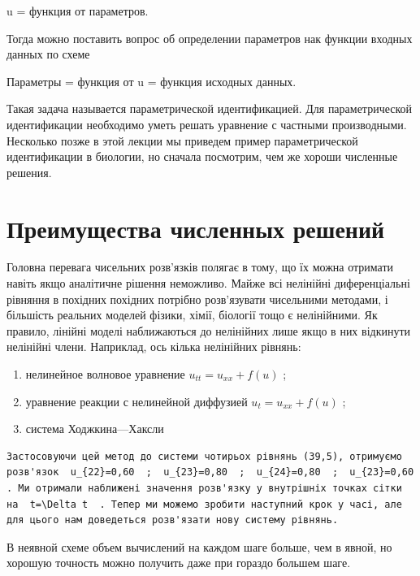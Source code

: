 \documentclass[
  ukrainian,
]{article}
\begin{document}
u = функция от параметров.

Тогда можно поставить вопрос об определении параметров нак функции
входных данных по схеме

Параметры = функция от u = функция исходных данных.

Такая задача называется параметрической идентификацией. Для
параметрической идентификации необходимо уметь решать уравнение с
частными производными. Несколько позже в этой лекции мы приведем пример
параметрической идентификации в биологии, но сначала посмотрим, чем же
хороши численные решения.

\section{Преимущества численных
решений}\label{ux43fux440ux435ux438ux43cux443ux449ux435ux441ux442ux432ux430-ux447ux438ux441ux43bux435ux43dux43dux44bux445-ux440ux435ux448ux435ux43dux438ux439}

Головна перевага чисельних розв'язків полягає в тому, що їх можна
отримати навіть якщо аналітичне рішення неможливо. Майже всі нелінійні
диференціальні рівняння в похідних похідних потрібно розв'язувати
чисельними методами, і більшість реальних моделей фізики, хімії,
біології тощо є нелінійними. Як правило, лінійні моделі наближаються до
нелінійних лише якщо в них відкинути нелінійні члени. Наприклад, ось
кілька нелінійних рівнянь:

\begin{enumerate}
\def\labelenumi{\arabic{enumi})}
\item
  нелинейное волновое уравнение \(u_{tt} = u_{xx} + f(u)\) ;
\item
  уравнение реакции с нелинейной диффузией \(u_t = u_{xx} + f(u)\) ;
\item
  система Ходжкина---Хаксли
\end{enumerate}

\begin{verbatim}
Застосовуючи цей метод до системи чотирьох рівнянь (39,5), отримуємо розв'язок  u_{22}=0,60  ;  u_{23}=0,80  ;  u_{24}=0,80  ;  u_{23}=0,60  . Ми отримали наближені значення розв'язку у внутрішніх точках сітки на  t=\Delta t  . Тепер ми можемо зробити наступний крок у часі, але для цього нам доведеться розв'язати нову систему рівнянь.
\end{verbatim}

В неявной схеме объем вычислений на каждом шаге больше, чем в явной, но
хорошую точность можно получить даже при гораздо большем шаге.
\end{document}
